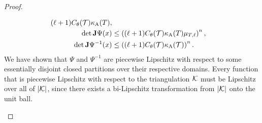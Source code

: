 \documentclass[10pt,a4paper]{article}
\newcommand{\mwl}[1]{{\color{red}#1}}
\begin{document}
\begin{proof}
\begin{itemize}
\begin{align}
            (\ell+1) \diameterratio(\calT) \aspectratio(T) 
            ,
            \\
            \det\Jacobian\Psi(x)
            &\leq 
            \left( 
            (\ell+1)
            \diameterratio(\calT)
            \aspectratio(T)\mu_{T,\ell} %
            \right)^{n},
            \\
            \det\Jacobian\Psi^{-1}(x)
            &\leq 
            \left( 
            (\ell+1)
            \diameterratio(\calT)
            \aspectratio(\calT) 
            \right)^{n}
            .
        \end{align}
        We have shown that $\Psi$ and $\Psi^{-1}$ are piecewise Lipschitz with respect to some essentially disjoint closed partitions over their respective domains.
        Every function that is piecewise Lipschitz with respect to the triangulation ${\mathcal K}$ must be Lipschitz over all of $\left| {\mathcal K} \right|$, since there exists a bi-Lipschitz transformation from $\left| {\mathcal K} \right|$ onto the unit ball.
        

\end{itemize}
\end{proof}
\end{document}
